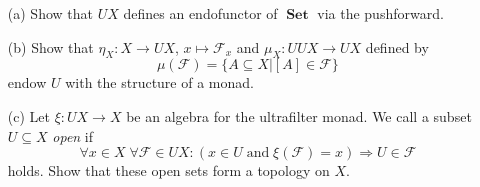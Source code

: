 \documentclass[12pt, a4paper]{article}
\DeclareMathOperator{\Set}{\mathbf{Set}}
\newcommand{\ca}[1]{\mathscr{#1}}
\theoremstyle{plain}
\theoremstyle{definition}
\theoremstyle{citing}
\theoremstyle{citingdfn}
\numberwithin{equation}{section}
\begin{document}
 \begin{enumerate}
 \item[(a)] Show that $UX$ defines an endofunctor of $\Set$ via the pushforward.
 \item[(b)] Show that $\eta_X \colon X \rightarrow UX$, $x \mapsto \ca{F}_x$ and $\mu_X \colon UUX \rightarrow UX$ defined by
 \[
   \mu(\ca{F})=\{A \subseteq X \vert [A] \in \ca{F} \}
 \]
 endow $U$ with the structure of a monad.
 
 \item[(c)]
  Let $\xi \colon UX \rightarrow X$ be an algebra for the ultrafilter monad. We call a subset $U \subseteq X$ \emph{open} if
  \[
  \forall x \in X \; \forall \ca{F} \in UX \colon (x \in U \; \text{and} \; \xi(\ca{F})=x) \Rightarrow  U \in \ca{F}
  \]
  holds. Show that these open sets form a topology on $X$.
\end{enumerate}  
\end{document}
